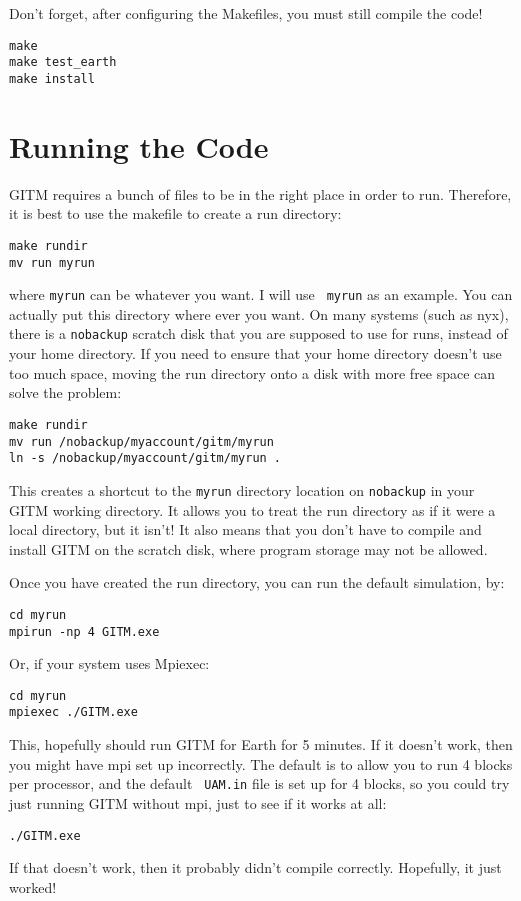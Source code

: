 Don't forget, after configuring the Makefiles, you must still compile the code!
\begin{verbatim}
make
make test_earth
make install
\end{verbatim}

\section{Running the Code}

GITM requires a bunch of files to be in the right place in order to
run.  Therefore, it is best to use the makefile to create a run
directory:
\begin{verbatim}
make rundir
mv run myrun
\end{verbatim}
where {\tt myrun} can be whatever you want.  I will use {\tt
myrun} as an example.  You can actually put this directory where ever
you want.  On many systems (such as nyx), there is a {\tt nobackup} scratch disk that
you are supposed to use for runs, instead of your home directory.  If you need to ensure that your home directory doesn't use too much space, moving the run directory onto a disk with more free space can solve the problem:

\begin{verbatim}
make rundir
mv run /nobackup/myaccount/gitm/myrun
ln -s /nobackup/myaccount/gitm/myrun .
\end{verbatim}

This creates a shortcut to the {\tt myrun} directory location on {\tt nobackup} in your GITM working directory.  It allows you to treat the run directory as if it were a local directory, but it isn't!  It also means that you don't have to compile and install GITM on the scratch disk, where program storage may not be allowed.

Once you have created the run directory, you can run the default simulation, by:

\begin{verbatim}
cd myrun
mpirun -np 4 GITM.exe
\end{verbatim}

Or, if your system uses Mpiexec:

\begin{verbatim}
cd myrun
mpiexec ./GITM.exe
\end{verbatim}

This, hopefully should run GITM for Earth for 5 minutes.  If it
doesn't work, then you might have mpi set up incorrectly.  The default
is to allow you to run 4 blocks per processor, and the default {\tt
UAM.in} file is set up for 4 blocks, so you could try just running
GITM without mpi, just to see if it works at all:
\begin{verbatim}
./GITM.exe
\end{verbatim}
If that doesn't work, then it probably didn't compile correctly.
Hopefully, it just worked!

